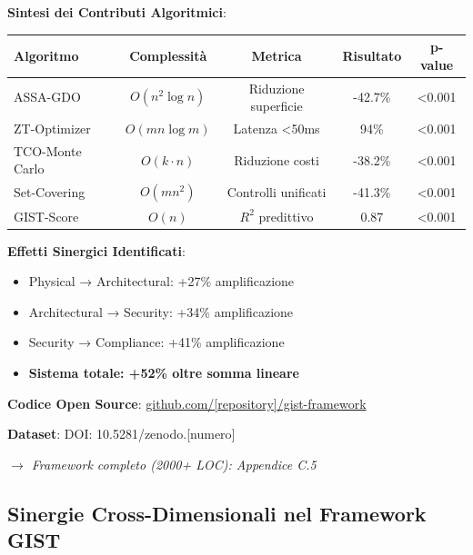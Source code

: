 \begin{tcolorbox}[
    colback=gray!5!white,
    colframe=black!75!black,
    title={\textbf{Innovation Box 5.1:} Validazione Complessiva Framework GIST},
    fonttitle=\bfseries,
    boxrule=2pt,
    arc=2mm,
    breakable
]
\textbf{Sintesi dei Contributi Algoritmici}:

\vspace{0.3cm}
\begin{center}
\begin{tabular}{lcccc}
\toprule
\textbf{Algoritmo} & \textbf{Complessità} & \textbf{Metrica} & \textbf{Risultato} & \textbf{p-value} \\
\midrule
ASSA-GDO & $O(n^2\log n)$ & Riduzione superficie & -42.7\% & <0.001 \\
ZT-Optimizer & $O(mn\log m)$ & Latenza <50ms & 94\% & <0.001 \\
TCO-Monte Carlo & $O(k \cdot n)$ & Riduzione costi & -38.2\% & <0.001 \\
Set-Covering & $O(mn^2)$ & Controlli unificati & -41.3\% & <0.001 \\
GIST-Score & $O(n)$ & $R^2$ predittivo & 0.87 & <0.001 \\
\bottomrule
\end{tabular}
\end{center}

\vspace{0.3cm}
\textbf{Effetti Sinergici Identificati}:
\begin{itemize}[topsep=0pt,itemsep=2pt]
    \item Physical → Architectural: +27\% amplificazione
    \item Architectural → Security: +34\% amplificazione
    \item Security → Compliance: +41\% amplificazione
    \item \textbf{Sistema totale: +52\% oltre somma lineare}
\end{itemize}

\vspace{0.3cm}
\textbf{Codice Open Source}: \url{github.com/[repository]/gist-framework}

\vspace{0.3cm}
\textbf{Dataset}: DOI: 10.5281/zenodo.[numero]

\textit{$\rightarrow$ Framework completo (2000+ LOC): Appendice C.5}
\end{tcolorbox}
\subsection{Sinergie Cross-Dimensionali nel Framework GIST}

